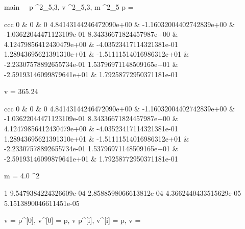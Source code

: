 \documentclass[12pt,a4paper]{book}
\begin{document}
\begin{eqcode}{main}{\ }{\ }{}
    p \in {}^2_{5,3},
    v \in {}^2_{5,3},
    m \in {}^2_{5} \lend
    p = \begin{tmatrix}{ccc}
            0 & 0 & 0 \lend
            4.84143144246472090e+00 & -1.16032004402742839e+00 &
            -1.03622044471123109e-01 \lend
            8.34336671824457987e+00 & 4.12479856412430479e+00 &
            -4.03523417114321381e-01 \lend
            1.28943695621391310e+01 & -1.51111514016986312e+01 &
            -2.23307578892655734e-01 \lend
            1.53796971148509165e+01 & -2.59193146099879641e+01 &
            1.79258772950371181e-01 \lend 
        \end{tmatrix} \lend
    v = 365.24 \cdot
        \begin{tmatrix}{ccc}
            0 & 0 & 0 \lend
            4.84143144246472090e+00 & -1.16032004402742839e+00 &
            -1.03622044471123109e-01 \lend
            8.34336671824457987e+00 & 4.12479856412430479e+00 &
            -4.03523417114321381e-01 \lend
            1.28943695621391310e+01 & -1.51111514016986312e+01 &
            -2.23307578892655734e-01 \lend
            1.53796971148509165e+01 & -2.59193146099879641e+01 &
            1.79258772950371181e-01 \lend 
        \end{tmatrix} \lend
    m = 4.0 \cdot \pi^2 \cdot 
        \begin{tvector}
            1 \lend
            9.5479384224326609e-04 \lend
            2.8588598066613812e-04 \lend
            4.3662440433515629e-05 \lend
            5.1513890046611451e-05 \lend
        \end{tvector} \lend
    v =  \lend
     \lend
    p^{[0]}, v^{[0]} = p, v \lend
    p^{[i]}, v^{[i]} =  \lend
    p, v =  \lend
     \lend
     \lend 
\end{eqcode}
\end{document}
